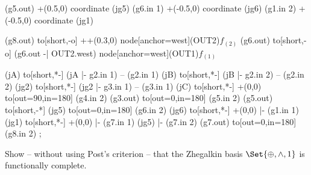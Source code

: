 \documentclass[a4paper,12pt]{article}
\begin{document}
\begin{tasks}
\begin{circuitikz}[]
            (g5.out) +(0.5,0) coordinate (jg5)
            (g6.in 1) +(-0.5,0) coordinate (jg6)
            (g1.in 2) +(-0.5,0) coordinate (jg1)

            (g8.out) to[short,-o] ++(0.3,0) node[anchor=west](OUT2){$f_{(2)}$}
            (g6.out) to[short,-o] (g6.out -| OUT2.west) node[anchor=west](OUT1){$f_{(1)}$}

            (jA) to[short,*-] (jA |- g2.in 1) -- (g2.in 1)
            (jB) to[short,*-] (jB |- g2.in 2) -- (g2.in 2)
            (jg2) to[short,*-] (jg2 |- g3.in 1) -- (g3.in 1)
            (jC) to[short,*-] +(0,0) to[out=90,in=180] (g4.in 2)
            (g3.out) to[out=0,in=180] (g5.in 2)
            (g5.out) to[short,-*] (jg5) to[out=0,in=180] (g6.in 2)
            (jg6) to[short,*-] +(0,0) |- (g1.in 1)
            (jg1) to[short,*-] +(0,0) |- (g7.in 1)
            (jg5) |- (g7.in 2)
            (g7.out) to[out=0,in=180] (g8.in 2)
        ;
    \end{circuitikz}
    \vspace{6pt}


    \item Show \--- without using Post's criterion \--- that the Zhegalkin basis $\Set{\xor, \land, 1}$ is functionally complete.




\end{tasks}
\end{document}
